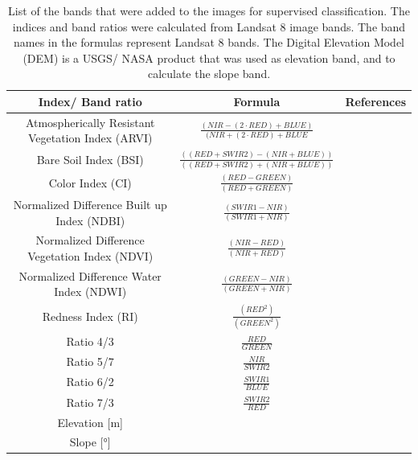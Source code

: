 \documentclass[11pt, A4, oneside]{report}
\begin{document}
\begin{rotatepage}
\begin{landscape}
\begin{table}
\caption{List of the bands that were added to the images for supervised classification. The indices and band ratios were calculated from Landsat 8 image bands. The band names in the formulas represent Landsat 8 bands. The Digital Elevation Model (DEM) is a USGS/ NASA product that was used as elevation band, and to calculate the slope band.}
\centering
\bgroup%
\def\arraystretch{2}%
\begin{tabular}{c c c}
  \hline
 Index/ Band ratio & Formula & References  \\ 
  \hline
Atmospherically Resistant Vegetation Index (ARVI) & \(\frac{(NIR-(2\cdot RED)+BLUE)}{(NIR+(2 \cdot RED)+BLUE}\) & \citet{Yuvaraj.2022, Kaufman.1992}\\
Bare Soil Index (BSI)& \(\frac{((RED+SWIR2)-(NIR+BLUE))}{((RED+SWIR2)+(NIR+BLUE))}\)& \citet{Diek.2017}\\
Color Index (CI) & \(\frac{(RED-GREEN)}{(RED+GREEN)}\) &\citet{Yuvaraj.2022}\\
Normalized Difference Built up Index (NDBI) & \(\frac{(SWIR1-NIR)}{(SWIR1+NIR)}\) & \citet{Zha.2003}\\
Normalized Difference Vegetation Index (NDVI)& \(\frac{(NIR-RED)}{(NIR+RED)}\) & \citet{Rouse.1973}\\
Normalized Difference Water Index (NDWI)& \(\frac{(GREEN-NIR)}{(GREEN+NIR)}\) & \citet{McFeeters.1996}\\
Redness Index (RI)& \(\frac{(RED^2)}{(GREEN^2)}\) & \citet{Yuvaraj.2022}\\
Ratio 4/3 & \(\frac{RED}{GREEN}\) & \citet{Mwaniki.2015}\\
Ratio 5/7 & \(\frac{NIR}{SWIR2}\) & \citet{NgoThi.2019}\\
Ratio 6/2 & \(\frac{SWIR1}{BLUE}\) & \citet{Mwaniki.2015}\\
Ratio 7/3 & \(\frac{SWIR2}{RED}\) & \citet{Mwaniki.2015}\\
Elevation [m] & & \citet{Farr.2007}\\
Slope [°]& & \citet{Farr.2007}\\

            
   \hline
\end{tabular}
\egroup%
\label{tab:bandratios}
\end{table}
\end{landscape}
\end{rotatepage}
\end{document}
